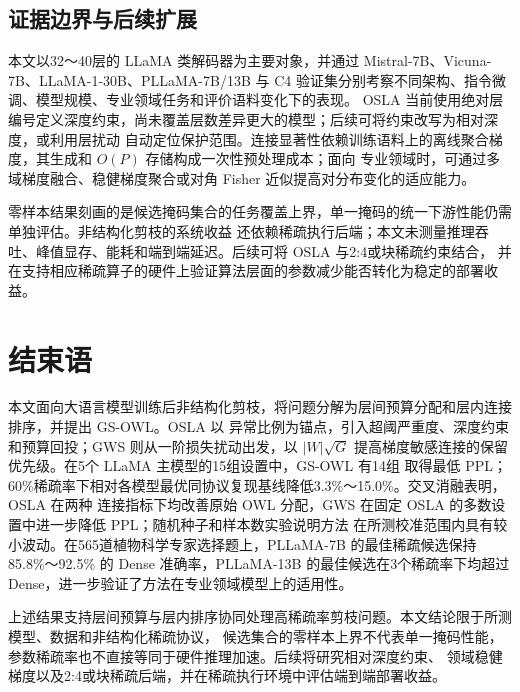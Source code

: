 \documentclass[UTF8,fontset=fandol]{ctexart}
\newcommand{\method}{GS-OWL}
\begin{document}
\subsection{证据边界与后续扩展}

本文以32～40层的 LLaMA 类解码器为主要对象，并通过 Mistral-7B、Vicuna-7B、LLaMA-1-30B、PLLaMA-7B/13B
与 C4 验证集分别考察不同架构、指令微调、模型规模、专业领域任务和评价语料变化下的表现。
OSLA 当前使用绝对层编号定义深度约束，尚未覆盖层数差异更大的模型；后续可将约束改写为相对深度，或利用层扰动
自动定位保护范围。连接显著性依赖训练语料上的离线聚合梯度，其生成和 $O(P)$ 存储构成一次性预处理成本；面向
专业领域时，可通过多域梯度融合、稳健梯度聚合或对角 Fisher 近似提高对分布变化的适应能力。

零样本结果刻画的是候选掩码集合的任务覆盖上界，单一掩码的统一下游性能仍需单独评估。非结构化剪枝的系统收益
还依赖稀疏执行后端；本文未测量推理吞吐、峰值显存、能耗和端到端延迟。后续可将 OSLA 与2:4或块稀疏约束结合，
并在支持相应稀疏算子的硬件上验证算法层面的参数减少能否转化为稳定的部署收益。

\section{结束语}

本文面向大语言模型训练后非结构化剪枝，将问题分解为层间预算分配和层内连接排序，并提出 \method。OSLA 以
异常比例为锚点，引入超阈严重度、深度约束和预算回投；GWS 则从一阶损失扰动出发，以
$\lvert W\rvert\sqrt{G}$ 提高梯度敏感连接的保留优先级。在5个 LLaMA 主模型的15组设置中，GS-OWL 有14组
取得最低 PPL；60\%稀疏率下相对各模型最优同协议复现基线降低3.3\%～15.0\%。交叉消融表明，OSLA 在两种
连接指标下均改善原始 OWL 分配，GWS 在固定 OSLA 的多数设置中进一步降低 PPL；随机种子和样本数实验说明方法
在所测校准范围内具有较小波动。在565道植物科学专家选择题上，PLLaMA-7B 的最佳稀疏候选保持85.8\%～92.5\%
的 Dense 准确率，PLLaMA-13B 的最佳候选在3个稀疏率下均超过 Dense，进一步验证了方法在专业领域模型上的适用性。

上述结果支持层间预算与层内排序协同处理高稀疏率剪枝问题。本文结论限于所测模型、数据和非结构化稀疏协议，
候选集合的零样本上界不代表单一掩码性能，参数稀疏率也不直接等同于硬件推理加速。后续将研究相对深度约束、
领域稳健梯度以及2:4或块稀疏后端，并在稀疏执行环境中评估端到端部署收益。

\FloatBarrier

\end{document}
